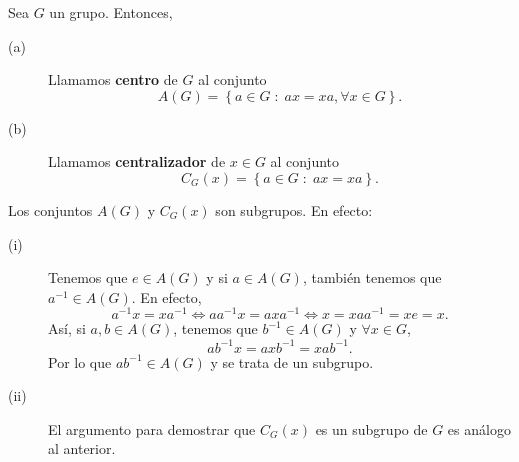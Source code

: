 \begin{definition}
Sea $\displaystyle G $ un grupo. Entonces, 
\begin{description}
\item[(a)] Llamamos \textbf{centro} de $\displaystyle G $ al conjunto 
	\[A\left(G\right) = \left\{ a \in G \; : \; ax = xa, \forall x \in G\right\}  .\]
\item[(b)] Llamamos \textbf{centralizador} de $\displaystyle x \in G $ al conjunto 
	\[C_{G}\left(x\right) = \left\{ a \in G \; : \; ax = xa\right\}  .\]
\end{description}
\end{definition}
\begin{observation}
Los conjuntos $\displaystyle A\left(G\right) $ y $\displaystyle C_{G}\left(x\right) $ son subgrupos. En efecto:
\begin{description}
\item[(i)] Tenemos que $\displaystyle e \in A\left(G\right) $ y si $\displaystyle a \in A\left(G\right) $, también tenemos que $\displaystyle a^{-1} \in A\left(G\right) $. En efecto, 
	\[a^{-1}x = xa^{-1} \iff a a^{-1}x = a x a^{-1} \iff x = x a a^{-1} = x e = x .\]
	Así, si $\displaystyle a,b \in A\left(G\right) $, tenemos que $\displaystyle b^{-1} \in A\left(G\right) $ y $\displaystyle \forall x \in G $,
	\[ab^{-1}x = axb^{-1} = xab^{-1} .\]
	Por lo que $\displaystyle ab^{-1} \in A\left(G\right) $ y se trata de un subgrupo.
\item[(ii)] El argumento para demostrar que $\displaystyle C_{G}\left(x\right) $ es un subgrupo de $\displaystyle G $ es análogo al anterior.
\end{description}
\end{observation}

